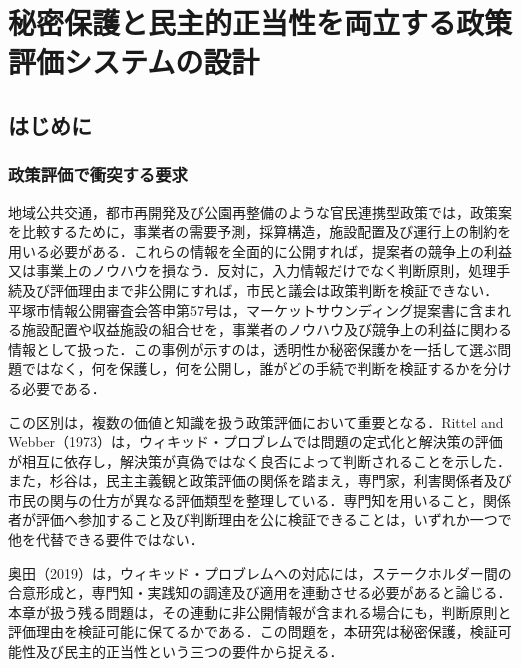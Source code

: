 
\chapter{秘密保護と民主的正当性を両立する政策評価システムの設計}
\label{chap:policy_eval_system}

\section{はじめに}
\label{sec:ch5_introduction}

\subsection{政策評価で衝突する要求}

地域公共交通，都市再開発及び公園再整備のような官民連携型政策では，政策案を比較するために，事業者の需要予測，採算構造，施設配置及び運行上の制約を用いる必要がある．これらの情報を全面的に公開すれば，提案者の競争上の利益又は事業上のノウハウを損なう．反対に，入力情報だけでなく判断原則，処理手続及び評価理由まで非公開にすれば，市民と議会は政策判断を検証できない．平塚市情報公開審査会答申第57号は，マーケットサウンディング提案書に含まれる施設配置や収益施設の組合せを，事業者のノウハウ及び競争上の利益に関わる情報として扱った\cite{hiratsuka2024toshin57}．この事例が示すのは，透明性か秘密保護かを一括して選ぶ問題ではなく，何を保護し，何を公開し，誰がどの手続で判断を検証するかを分ける必要である．

この区別は，複数の価値と知識を扱う政策評価において重要となる．Rittel and Webber（1973）は，ウィキッド・プロブレムでは問題の定式化と解決策の評価が相互に依存し，解決策が真偽ではなく良否によって判断されることを示した\cite{rittel1973}．また，杉谷は，民主主義観と政策評価の関係を踏まえ，専門家，利害関係者及び市民の関与の仕方が異なる評価類型を整理している\cite{sugitani2019ebpm}．専門知を用いること，関係者が評価へ参加すること及び判断理由を公に検証できることは，いずれか一つで他を代替できる要件ではない．

奥田（2019）は，ウィキッド・プロブレムへの対応には，ステークホルダー間の合意形成と，専門知・実践知の調達及び適用を連動させる必要があると論じる\cite{okuda2019howlett}．本章が扱う残る問題は，その連動に非公開情報が含まれる場合にも，判断原則と評価理由を検証可能に保てるかである．この問題を，本研究は秘密保護，検証可能性及び民主的正当性という三つの要件から捉える．

